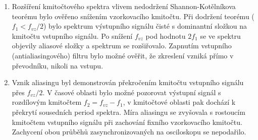 \documentclass[a4paper, czech]{article}
\begin{document}
\begin{enumerate}
\item Rozšíření kmitočtového spektra vlivem nedodržení Shannon-Kotělníkova teorému bylo ověřeno snížením vzorkovacího kmitočtu.
Při dodržení teorému ($f_1 < f_{vz}/2$) bylo spektrum výstupního signálu čisté s dominantní složkou na kmitočtu vstupního signálu.
Po snížení $f_{vz}$ pod hodnotu $2 f_1$ se ve spektru objevily aliasové složky a spektrum se rozšiřovalo.
Zapnutím vstupního (antialiasingového) filtru bylo možné ověřit, že zkreslení vzniká přímo v převodníku, nikoli na vstupu.

\item Vznik aliasingu byl demonstrován překročením kmitočtu vstupního signálu přes $f_{vz}/2$.
V časové oblasti bylo možné pozorovat výstupní signál s rozdílovým kmitočtem $f_2 = f_{vz} - f_1$, v kmitočtové oblasti pak dochází k překrytí sousedních period spektra.
Míra aliasingu se zvyšovala s rostoucím kmitočtem vstupního signálu při zachování fixního vzorkovacího kmitočtu.
Zachycení obou průběhů zasynchronizovaných na osciloskopu se nepodařilo.

\end{enumerate}
\end{document}
